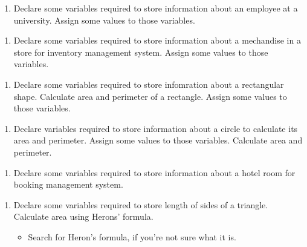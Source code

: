 \documentclass[11pt]{article}
\providecommand{\tightlist}{%
      \setlength{\itemsep}{0pt}\setlength{\parskip}{0pt}}
\begin{document}
    \begin{enumerate}
\def\labelenumi{\arabic{enumi}.}
\setcounter{enumi}{1}
\tightlist
\item
  Declare some variables required to store information about an employee
  at a university. Assign some values to those variables.
\end{enumerate}

    \begin{enumerate}
\def\labelenumi{\arabic{enumi}.}
\setcounter{enumi}{2}
\tightlist
\item
  Declare some variables required to store information about a
  mechandise in a store for inventory management system. Assign some
  values to those variables.
\end{enumerate}

    \begin{enumerate}
\def\labelenumi{\arabic{enumi}.}
\setcounter{enumi}{3}
\tightlist
\item
  Declare some variables required to store infomration about a
  rectangular shape. Calculate area and perimeter of a rectangle. Assign
  some values to those variables.
\end{enumerate}

    \begin{enumerate}
\def\labelenumi{\arabic{enumi}.}
\setcounter{enumi}{4}
\tightlist
\item
  Declare variables required to store information about a circle to
  calculate its area and perimeter. Assign some values to those
  variables. Calculate area and perimeter.
\end{enumerate}

    \begin{enumerate}
\def\labelenumi{\arabic{enumi}.}
\setcounter{enumi}{5}
\tightlist
\item
  Declare some variables required to store information about a hotel
  room for booking management system.
\end{enumerate}

    \begin{enumerate}
\def\labelenumi{\arabic{enumi}.}
\setcounter{enumi}{6}
\tightlist
\item
  Declare some variables required to store length of sides of a
  triangle. Calculate area using Herons' formula.

  \begin{itemize}
  \tightlist
  \item
    Search for Heron's formula, if you're not sure what it is.
  \end{itemize}
\end{enumerate}
\end{document}
